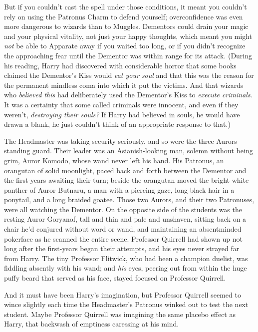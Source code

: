 But if you couldn't cast the spell under those conditions, it meant you
couldn't rely on using the Patronus Charm to defend yourself; overconfidence
was even more dangerous to wizards than to Muggles. Dementors could drain your
magic and your physical vitality, not just your happy thoughts, which meant you
might \emph{not} be able to Apparate away if you waited too long, or if you
didn't recognize the approaching fear until the Dementor was within range for
its attack. (During his reading, Harry had discovered with considerable horror
that some books claimed the Dementor's Kiss would \emph{eat your soul} and that
this was the reason for the permanent mindless coma into which it put the
victims. And that wizards who \emph{believed this} had deliberately used the
Dementor's Kiss to \emph{execute criminals.} It was a certainty that some
called criminals were innocent, and even if they weren't, \emph{destroying
their souls?} If Harry had believed in souls, he would have{\el} drawn a
blank, he just couldn't think of an appropriate response to that.)

The Headmaster was taking security seriously, and so were the three Aurors
standing guard. Their leader was an Asianish-looking man, solemn without being
grim, Auror Komodo, whose wand never left his hand. His Patronus, an orangutan
of solid moonlight, paced back and forth between the Dementor and the
first-years awaiting their turn; beside the orangutan moved the bright white
panther of Auror Butnaru, a man with a piercing gaze, long black hair in a
ponytail, and a long braided goatee. Those two Aurors, and their two
Patronuses, were all watching the Dementor. On the opposite side of the
students was the resting Auror Goryanof, tall and thin and pale and unshaven,
sitting back on a chair he'd conjured without word or wand, and maintaining an
absentminded pokerface as he scanned the entire scene. Professor Quirrell had
shown up not long after the first-years began their attempts, and his eyes
never strayed far from Harry. The tiny Professor Flitwick, who had been a
champion duelist, was fiddling absently with his wand; and \emph{his} eyes,
peering out from within the huge puffy beard that served as his face, stayed
focused on Professor Quirrell.

And it must have been Harry's imagination, but Professor Quirrell seemed to
wince slightly each time the Headmaster's Patronus winked out to test the next
student. Maybe Professor Quirrell was imagining the same placebo effect as
Harry, that backwash of emptiness caressing at his mind.

